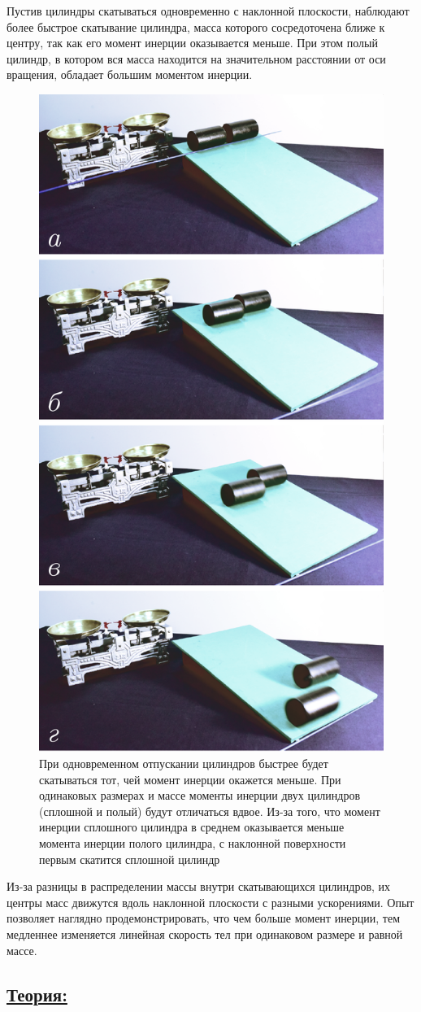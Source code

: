 \documentclass[14pt,a4paper,oneside]{extarticle}	%
\begin{document}
	Пустив цилиндры скатываться одновременно с наклонной плоскости, наблюдают более 
	быстрое скатывание цилиндра, масса которого сосредоточена ближе к центру, так как его момент инерции оказывается меньше.
	При этом полый цилиндр, в котором вся масса находится на значительном расстоянии от оси вращения, обладает большим моментом инерции.
	
			\begin{figure}[H] 	
		\centering 	
		\includegraphics[width=0.5\linewidth]{inclinedplane-2.png}
		\caption{При одновременном отпускании цилиндров быстрее будет скатываться тот, чей момент инерции окажется меньше. При одинаковых размерах и массе моменты инерции двух цилиндров (сплошной и полый) будут отличаться вдвое. Из-за того, что момент инерции сплошного цилиндра в среднем оказывается меньше момента инерции полого цилиндра, с наклонной поверхности первым скатится сплошной цилиндр}
		\label{inclinedplane-2}
	\end{figure}

	Из-за разницы в распределении массы внутри скатывающихся цилиндров, их центры масс движутся вдоль наклонной плоскости с разными ускорениями.
	Опыт позволяет наглядно продемонстрировать, что чем больше момент инерции, тем медленнее изменяется линейная скорость тел при одинаковом размере и равной массе.
	
	\newpage	
	\subsection*{\underline{Теория:}}
	
\end{document}
